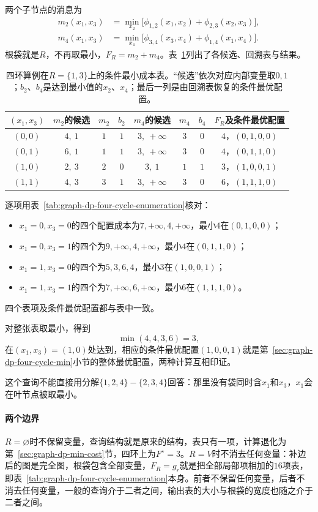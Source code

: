 两个子节点的消息为
\[
\begin{aligned}
m_2(x_1,x_3)&=\min_{x_2}\bigl[\phi_{1,2}(x_1,x_2)+\phi_{2,3}(x_2,x_3)\bigr],\\
m_4(x_1,x_3)&=\min_{x_4}\bigl[\phi_{3,4}(x_3,x_4)+\phi_{1,4}(x_1,x_4)\bigr].
\end{aligned}
\]
根袋就是$R$，不再取最小，$F_R=m_2+m_4$。表~\ref{tab:graph-dp-four-cycle-retained}列出了各候选、回溯表与结果。

\begin{table}[!htb]
  \centering
  \small
  \begin{tabular}{@{}cccccccc@{}}
    \toprule
    $(x_1,x_3)$ & $m_2$的候选 & $m_2$ & $b_2$ & $m_4$的候选 & $m_4$ & $b_4$ & $F_R$及条件最优配置\\
    \midrule
    $(0,0)$ & $4,\ 1$ & $1$ & $1$ & $3,\ +\infty$ & $3$ & $0$ & $4$，$(0,1,0,0)$\\
    $(0,1)$ & $6,\ 1$ & $1$ & $1$ & $3,\ +\infty$ & $3$ & $0$ & $4$，$(0,1,1,0)$\\
    $(1,0)$ & $2,\ 3$ & $2$ & $0$ & $3,\ 1$ & $1$ & $1$ & $3$，$(1,0,0,1)$\\
    $(1,1)$ & $4,\ 3$ & $3$ & $1$ & $3,\ +\infty$ & $3$ & $0$ & $6$，$(1,1,1,0)$\\
    \bottomrule
  \end{tabular}
  \caption{四环算例在$R=\{1,3\}$上的条件最小成本表。“候选”依次对应内部变量取$0,1$；$b_2$、$b_4$是达到最小值的$x_2$、$x_4$；最后一列是由回溯表恢复的条件最优配置。}
  \label{tab:graph-dp-four-cycle-retained}
\end{table}

逐项用表~\ref{tab:graph-dp-four-cycle-enumeration}核对：
\begin{itemize}
  \item $x_1=0,x_3=0$的四个配置成本为$7,+\infty,4,+\infty$，最小$4$在$(0,1,0,0)$；
  \item $x_1=0,x_3=1$的四个为$9,+\infty,4,+\infty$，最小$4$在$(0,1,1,0)$；
  \item $x_1=1,x_3=0$的四个为$5,3,6,4$，最小$3$在$(1,0,0,1)$；
  \item $x_1=1,x_3=1$的四个为$7,+\infty,6,+\infty$，最小$6$在$(1,1,1,0)$。
\end{itemize}
四个表项及条件最优配置都与表中一致。

对整张表取最小，得到
\[
\min(4,4,3,6)=3,
\]
在$(x_1,x_3)=(1,0)$处达到，相应的条件最优配置$(1,0,0,1)$就是第~\ref{sec:graph-dp-four-cycle-min}小节的整体最优配置，两种计算互相印证。

这个查询不能直接用分解$\{1,2,4\}-\{2,3,4\}$回答：那里没有袋同时含$x_1$和$x_3$，$x_1$会在叶节点被取最小。

\paragraph{两个边界}
$R=\varnothing$时不保留变量，查询结构就是原来的结构，表只有一项，计算退化为第~\ref{sec:graph-dp-min-cost}节，四环上为$F^\star=3$。$R=V$时不消去任何变量：补边后的图是完全图，根袋包含全部变量，$F_R=g_r$就是把全部局部项相加的$16$项表，即表~\ref{tab:graph-dp-four-cycle-enumeration}本身。前者不保留任何变量，后者不消去任何变量，一般的查询介于二者之间，输出表的大小与根袋的宽度也随之介于二者之间。
